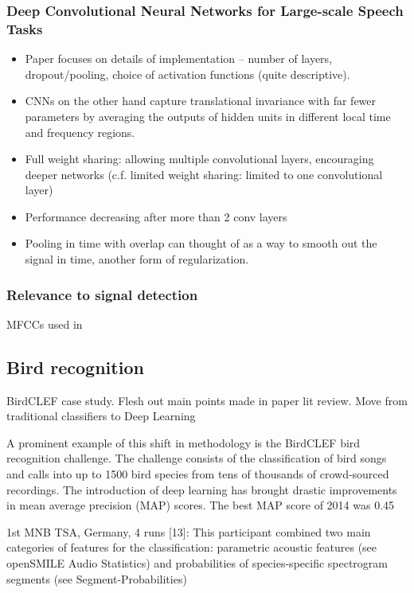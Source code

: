 \documentclass[12pt]{llncs}
\begin{document}
\subsubsection*{Deep Convolutional Neural Networks for Large-scale Speech Tasks \cite{sainath2015deep}}
\begin{itemize}
	\item Paper focuses on details of implementation -- number of layers, dropout/pooling, choice of activation functions (quite descriptive). 
	\item CNNs on the other hand capture translational invariance with far fewer parameters by averaging the outputs of hidden units in different local time and frequency regions.
	\item Full weight sharing: allowing multiple convolutional layers, encouraging deeper networks (c.f. limited weight sharing: limited to one convolutional layer)
	\item Performance decreasing after more than 2 conv layers
	\item Pooling in time with overlap can thought of as a way to smooth out the signal in time, another form of regularization.
\end{itemize}



\subsubsection{Relevance to signal detection}
MFCCs used in 





\subsection{Bird recognition}
BirdCLEF case study. Flesh out main points made in paper lit review. Move from traditional classifiers to Deep Learning

A prominent example of this shift in methodology is the BirdCLEF bird recognition challenge. The challenge consists of the classification of bird songs and calls into up to 1500 bird species from tens of thousands of crowd-sourced recordings. The introduction of deep learning has brought drastic improvements in mean average precision (MAP) scores. The best MAP score of 2014 was 0.45 \cite{goeau2015lifeclef}

1st
MNB TSA, Germany, 4 runs [13]: This participant combined two main
categories of features for the classification: parametric acoustic features (see
openSMILE Audio Statistics) and probabilities of species-specific spectrogram
segments (see Segment-Probabilities)
\end{document}
